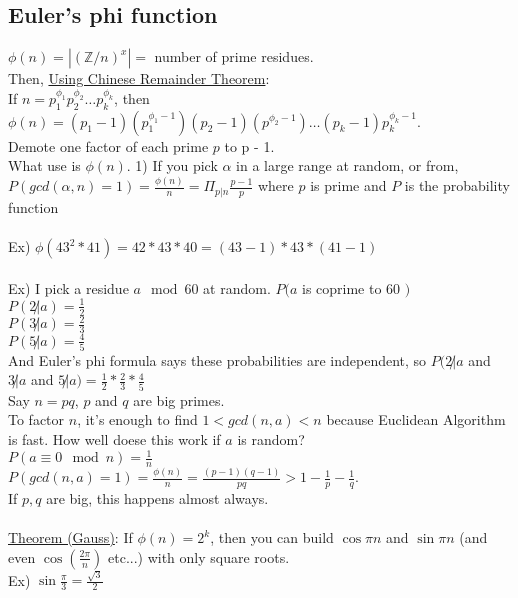 \documentclass[13pt]{article}
\begin{document}
	\subsection*{Euler's phi function}
		$\phi(n) = |(\mathbb{Z}/n)^x| = $ number of prime residues.\\
		Then, \underline{Using Chinese Remainder Theorem}:\\
		If $n = p_1^{\phi_1}p_2^{\phi_2}\ldots p_k^{\phi_k}$, then
		$\phi(n) = (p_1 - 1)(p_1^{\phi_1 - 1})(p_2 - 1)(p^{\phi_2 -1} ) \ldots
		(p_k - 1)p_k^{\phi_k - 1}$.\\
		Demote one factor of each prime $p$ to p - 1.\\
		What use is $\phi(n)$.
		1) If you pick $\alpha$ in a large range at random, or from,\\
		$P(gcd(\alpha, n) = 1) = \frac{\phi(n)}{n} = \Pi_{p|n}\frac{p-1}{p}$
		where $p$ is prime and $P$ is the probability function\\\\
		Ex) $\phi(43^2 * 41) = 42*43*40 = (43 - 1)*43*(41-1)$\\\\
		Ex) I pick a residue $a \mod 60$ at random. $P(a$ is coprime to 60 $)$\\
		$P(2 \not| a) = \frac{1}{2}$\\
		$P(3 \not| a) = \frac{2}{3}$\\
		$P(5 \not| a) = \frac{4}{5}$\\
		And Euler's phi formula says these probabilities are independent, so
		$P(2 \not| a $ and $ 3 \not| a $ and $5 \not| a ) = \frac{1}{2} * 
		\frac{2}{3} * \frac{4}{5}$\\
		Say $n = pq$, $p$ and $q$ are big primes.\\
		To factor $n$, it's enough to find $1 < gcd(n,a) < n$ because Euclidean
		Algorithm is fast. How well doese this work if $a$ is random?\\
		$P(a \equiv 0 \mod n) = \frac{1}{n}$\\
		$P(gcd(n,a) = 1) = \frac{\phi(n)}{n} = \frac{(p - 1)(q - 1)}{pq} >
		1 - \frac{1}{p} - \frac{1}{q}$.\\
		If $p,q$ are big, this happens almost always.\\\\
		\underline{Theorem (Gauss)}: If $\phi(n) = 2^k$, then you can build
		$\cos{\pi}{n}$ and $\sin{\pi}{n}$ (and even $\cos\left(\frac{2\pi}{n}
		\right)$ etc...) with only square roots.\\
		Ex) $\sin \frac{\pi}{3} = \frac{\sqrt{3}}{2}$\\
\end{document}
